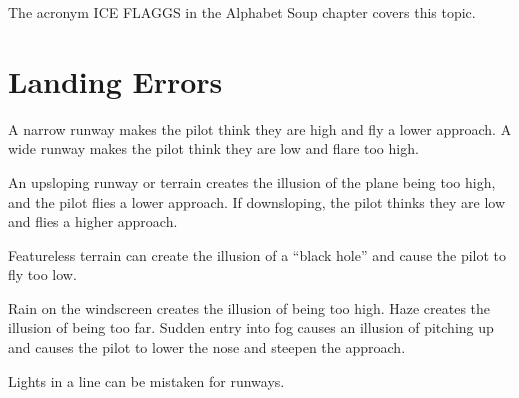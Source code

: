 The acronym ICE FLAGGS in the Alphabet Soup chapter covers this topic.

\section{Landing Errors}

A narrow runway makes the pilot think they are high and fly a lower approach. A wide runway makes the pilot think they are low and flare too high.

An upsloping runway or terrain creates the illusion of the plane being too high, and the pilot flies a lower approach. If downsloping, the pilot thinks they are low and flies a higher approach.

Featureless terrain can create the illusion of a ``black hole'' and cause the pilot to fly too low.

Rain on the windscreen creates the illusion of being too high. Haze creates the illusion of being too far. Sudden entry into fog causes an illusion of pitching up and causes the pilot to lower the nose and steepen the approach.

Lights in a line can be mistaken for runways.


